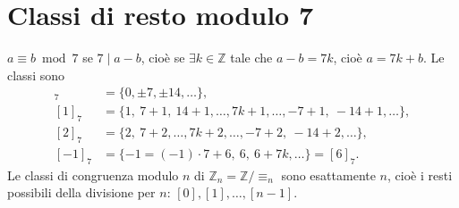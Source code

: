 \documentclass[11pt,a4paper]{article}
\begin{document}
\section{Classi di resto modulo 7}

$a \equiv b \bmod 7$ se $7 \mid a - b$, cioè se $\exists k \in \mathbb{Z}$ tale che $a - b = 7k$, cioè $a = 7k + b$. Le classi sono
\begin{align*}
  [0]_7 &= \{0, \pm 7, \pm 14, \dots\},\\
  [1]_7 &= \{1,\ 7 + 1,\ 14 + 1, \dots, 7k + 1, \dots, -7 + 1,\ -14 + 1, \dots\},\\
  [2]_7 &= \{2,\ 7 + 2, \dots, 7k + 2, \dots, -7 + 2,\ -14 + 2, \dots\},\\
  [-1]_7 &= \{-1 = (-1)\cdot 7 + 6,\ 6,\ 6 + 7k, \dots\} = [6]_7 .
\end{align*}
Le classi di congruenza modulo $n$ di $\mathbb{Z}_n = \mathbb{Z}/{\equiv_n}$ sono esattamente $n$, cioè i resti possibili della divisione per $n$: $[0], [1], \dots, [n-1]$.
\end{document}
